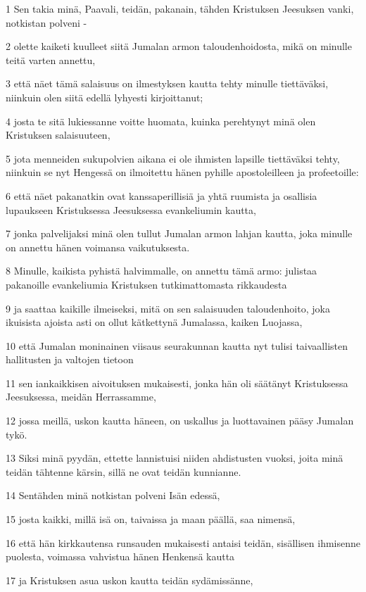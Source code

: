 \par 1 Sen takia minä, Paavali, teidän, pakanain, tähden Kristuksen Jeesuksen vanki, notkistan polveni -
\par 2 olette kaiketi kuulleet siitä Jumalan armon taloudenhoidosta, mikä on minulle teitä varten annettu,
\par 3 että näet tämä salaisuus on ilmestyksen kautta tehty minulle tiettäväksi, niinkuin olen siitä edellä lyhyesti kirjoittanut;
\par 4 josta te sitä lukiessanne voitte huomata, kuinka perehtynyt minä olen Kristuksen salaisuuteen,
\par 5 jota menneiden sukupolvien aikana ei ole ihmisten lapsille tiettäväksi tehty, niinkuin se nyt Hengessä on ilmoitettu hänen pyhille apostoleilleen ja profeetoille:
\par 6 että näet pakanatkin ovat kanssaperillisiä ja yhtä ruumista ja osallisia lupaukseen Kristuksessa Jeesuksessa evankeliumin kautta,
\par 7 jonka palvelijaksi minä olen tullut Jumalan armon lahjan kautta, joka minulle on annettu hänen voimansa vaikutuksesta.
\par 8 Minulle, kaikista pyhistä halvimmalle, on annettu tämä armo: julistaa pakanoille evankeliumia Kristuksen tutkimattomasta rikkaudesta
\par 9 ja saattaa kaikille ilmeiseksi, mitä on sen salaisuuden taloudenhoito, joka ikuisista ajoista asti on ollut kätkettynä Jumalassa, kaiken Luojassa,
\par 10 että Jumalan moninainen viisaus seurakunnan kautta nyt tulisi taivaallisten hallitusten ja valtojen tietoon
\par 11 sen iankaikkisen aivoituksen mukaisesti, jonka hän oli säätänyt Kristuksessa Jeesuksessa, meidän Herrassamme,
\par 12 jossa meillä, uskon kautta häneen, on uskallus ja luottavainen pääsy Jumalan tykö.
\par 13 Siksi minä pyydän, ettette lannistuisi niiden ahdistusten vuoksi, joita minä teidän tähtenne kärsin, sillä ne ovat teidän kunnianne.
\par 14 Sentähden minä notkistan polveni Isän edessä,
\par 15 josta kaikki, millä isä on, taivaissa ja maan päällä, saa nimensä,
\par 16 että hän kirkkautensa runsauden mukaisesti antaisi teidän, sisällisen ihmisenne puolesta, voimassa vahvistua hänen Henkensä kautta
\par 17 ja Kristuksen asua uskon kautta teidän sydämissänne,
